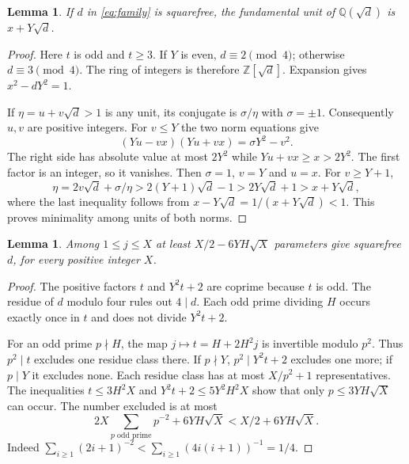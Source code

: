 \documentclass[11pt,letterpaper]{article}
\newtheorem{lemma}[theorem]{Lemma}
\begin{document}
\begin{lemma}\label{lem:unit}
If $d$ in \eqref{eq:family} is squarefree, the fundamental unit of $\mathbb Q(\sqrt d)$ is $x+Y\sqrt d$.
\end{lemma}
\begin{proof}
Here $t$ is odd and $t\ge3$. If $Y$ is even, $d\equiv2\pmod4$; otherwise $d\equiv3\pmod4$. The ring of integers is therefore $\mathbb Z[\sqrt d]$. Expansion gives $x^2-dY^2=1$.

If $\eta=u+v\sqrt d>1$ is any unit, its conjugate is $\sigma/\eta$ with $\sigma=\pm1$. Consequently $u,v$ are positive integers. For $v\le Y$ the two norm equations give
\[
                  (Yu-vx)(Yu+vx)=\sigma Y^2-v^2 .
\]
The right side has absolute value at most $2Y^2$ while $Yu+vx\ge x>2Y^2$. The first factor is an integer, so it vanishes. Then $\sigma=1$, $v=Y$ and $u=x$. For $v\ge Y+1$,
\[
 \eta=2v\sqrt d+\sigma/\eta
      >2(Y+1)\sqrt d-1>2Y\sqrt d+1>x+Y\sqrt d,
\]
where the last inequality follows from $x-Y\sqrt d=1/(x+Y\sqrt d)<1$. This proves minimality among units of both norms.
\end{proof}

\begin{lemma}\label{lem:sq}
Among $1\le j\le X$ at least $X/2-6YH\sqrt X$ parameters give squarefree $d$, for every positive integer $X$.
\end{lemma}
\begin{proof}
The positive factors $t$ and $Y^2t+2$ are coprime because $t$ is odd. The residue of $d$ modulo four rules out $4\mid d$. Each odd prime dividing $H$ occurs exactly once in $t$ and does not divide $Y^2t+2$.

For an odd prime $p\nmid H$, the map $j\mapsto t=H+2H^2j$ is invertible modulo $p^2$. Thus $p^2\mid t$ excludes one residue class there. If $p\nmid Y$, $p^2\mid Y^2t+2$ excludes one more; if $p\mid Y$ it excludes none. Each residue class has at most $X/p^2+1$ representatives. The inequalities $t\le3H^2X$ and $Y^2t+2\le5Y^2H^2X$ show that only $p\le3YH\sqrt X$ can occur. The number excluded is at most
\[
 2X\sum_{p\text{ odd prime}}p^{-2}+6YH\sqrt X
 < X/2+6YH\sqrt X.
\]
Indeed $\sum_{i\ge1}(2i+1)^{-2}<\sum_{i\ge1}(4i(i+1))^{-1}=1/4$.
\end{proof}
\end{document}
